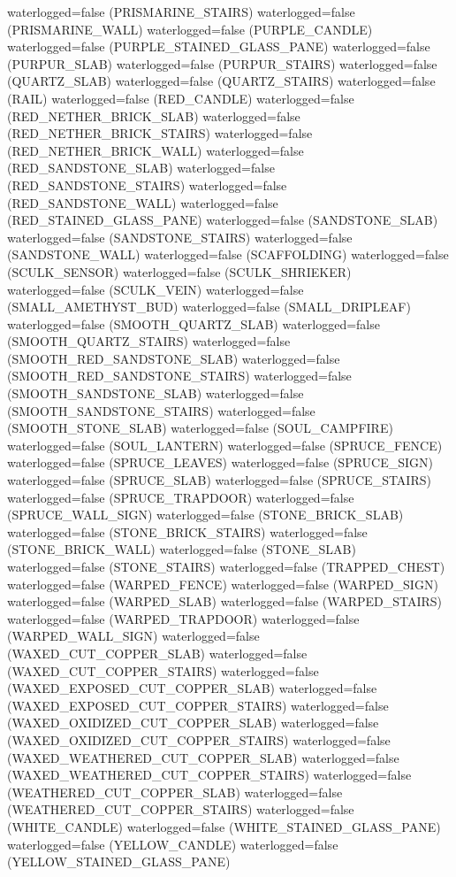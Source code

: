 \documentclass[11pt]{article}
\begin{document}
waterlogged=false (PRISMARINE_STAIRS)
waterlogged=false (PRISMARINE_WALL)
waterlogged=false (PURPLE_CANDLE)
waterlogged=false (PURPLE_STAINED_GLASS_PANE)
waterlogged=false (PURPUR_SLAB)
waterlogged=false (PURPUR_STAIRS)
waterlogged=false (QUARTZ_SLAB)
waterlogged=false (QUARTZ_STAIRS)
waterlogged=false (RAIL)
waterlogged=false (RED_CANDLE)
waterlogged=false (RED_NETHER_BRICK_SLAB)
waterlogged=false (RED_NETHER_BRICK_STAIRS)
waterlogged=false (RED_NETHER_BRICK_WALL)
waterlogged=false (RED_SANDSTONE_SLAB)
waterlogged=false (RED_SANDSTONE_STAIRS)
waterlogged=false (RED_SANDSTONE_WALL)
waterlogged=false (RED_STAINED_GLASS_PANE)
waterlogged=false (SANDSTONE_SLAB)
waterlogged=false (SANDSTONE_STAIRS)
waterlogged=false (SANDSTONE_WALL)
waterlogged=false (SCAFFOLDING)
waterlogged=false (SCULK_SENSOR)
waterlogged=false (SCULK_SHRIEKER)
waterlogged=false (SCULK_VEIN)
waterlogged=false (SMALL_AMETHYST_BUD)
waterlogged=false (SMALL_DRIPLEAF)
waterlogged=false (SMOOTH_QUARTZ_SLAB)
waterlogged=false (SMOOTH_QUARTZ_STAIRS)
waterlogged=false (SMOOTH_RED_SANDSTONE_SLAB)
waterlogged=false (SMOOTH_RED_SANDSTONE_STAIRS)
waterlogged=false (SMOOTH_SANDSTONE_SLAB)
waterlogged=false (SMOOTH_SANDSTONE_STAIRS)
waterlogged=false (SMOOTH_STONE_SLAB)
waterlogged=false (SOUL_CAMPFIRE)
waterlogged=false (SOUL_LANTERN)
waterlogged=false (SPRUCE_FENCE)
waterlogged=false (SPRUCE_LEAVES)
waterlogged=false (SPRUCE_SIGN)
waterlogged=false (SPRUCE_SLAB)
waterlogged=false (SPRUCE_STAIRS)
waterlogged=false (SPRUCE_TRAPDOOR)
waterlogged=false (SPRUCE_WALL_SIGN)
waterlogged=false (STONE_BRICK_SLAB)
waterlogged=false (STONE_BRICK_STAIRS)
waterlogged=false (STONE_BRICK_WALL)
waterlogged=false (STONE_SLAB)
waterlogged=false (STONE_STAIRS)
waterlogged=false (TRAPPED_CHEST)
waterlogged=false (WARPED_FENCE)
waterlogged=false (WARPED_SIGN)
waterlogged=false (WARPED_SLAB)
waterlogged=false (WARPED_STAIRS)
waterlogged=false (WARPED_TRAPDOOR)
waterlogged=false (WARPED_WALL_SIGN)
waterlogged=false (WAXED_CUT_COPPER_SLAB)
waterlogged=false (WAXED_CUT_COPPER_STAIRS)
waterlogged=false (WAXED_EXPOSED_CUT_COPPER_SLAB)
waterlogged=false (WAXED_EXPOSED_CUT_COPPER_STAIRS)
waterlogged=false (WAXED_OXIDIZED_CUT_COPPER_SLAB)
waterlogged=false (WAXED_OXIDIZED_CUT_COPPER_STAIRS)
waterlogged=false (WAXED_WEATHERED_CUT_COPPER_SLAB)
waterlogged=false (WAXED_WEATHERED_CUT_COPPER_STAIRS)
waterlogged=false (WEATHERED_CUT_COPPER_SLAB)
waterlogged=false (WEATHERED_CUT_COPPER_STAIRS)
waterlogged=false (WHITE_CANDLE)
waterlogged=false (WHITE_STAINED_GLASS_PANE)
waterlogged=false (YELLOW_CANDLE)
waterlogged=false (YELLOW_STAINED_GLASS_PANE)
\end{document}
